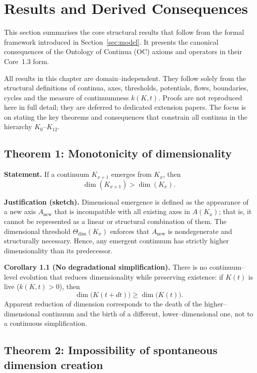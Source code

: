 
\section{Results and Derived Consequences}
\label{sec:results}

This section summarises the core structural results that follow from the formal
framework introduced in Section~\ref{sec:model}. It presents the canonical
consequences of the Ontology of Continua (OC) axioms and operators in their
Core~1.3 form.

All results in this chapter are domain–independent.
They follow solely from the structural definitions of continua, axes, thresholds, potentials, flows, boundaries, cycles and the measure of continuumness \(k(K,t)\).
Proofs are not reproduced here in full detail; they are deferred to dedicated extension papers.
The focus is on stating the key theorems and consequences that constrain all
continua in the hierarchy \(K_0\)–\(K_{12}\).

\subsection{Theorem 1: Monotonicity of dimensionality}

\textbf{Statement.}
If a continuum \(K_{x+1}\) emerges from \(K_x\), then
\[
    \dim(K_{x+1}) > \dim(K_x).
\]

\textbf{Justification (sketch).}
Dimensional emergence is defined as the appearance of a new axis \(A_{\mathrm{new}}\) that is incompatible with all existing axes in \(A(K_x)\); that is, it cannot be represented as a linear or structural combination of them.
The dimensional threshold \(\Theta_{\mathrm{dim}}(K_x)\) enforces that \(A_{\mathrm{new}}\) is nondegenerate and structurally necessary.
Hence, any emergent continuum has strictly higher dimensionality than its predecessor.

\textbf{Corollary 1.1 (No degradational simplification).}
There is no continuum–level evolution that reduces dimensionality while preserving existence:
if \(K(t)\) is live (\(k(K,t) > 0\)), then
\[
    \dim\big(K(t+dt)\big) \ge \dim\big(K(t)\big).
\]
Apparent reduction of dimension corresponds to the death of the higher–dimensional continuum and the birth of a different, lower–dimensional one, not to a continuous simplification.

\subsection{Theorem 2: Impossibility of spontaneous dimension creation}
\label{sec:theorem-spontaneous-dimension-creation}

